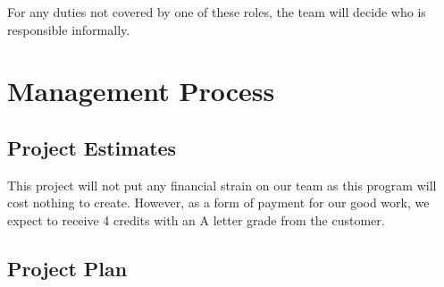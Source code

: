 \documentclass{article}
\begin{document}
\vspace{12 pt}

For any duties not covered by one of these roles, the team will decide who is responsible informally.
\section{Management Process}
\subsection{Project Estimates}\label{estimates}
This project will not put any financial strain on our team as this program will cost nothing to create.  However, as a form of payment for our good work, we expect to receive 4 credits with an A letter grade from the customer.
\subsection{Project Plan}\label{plans}
\end{document}
